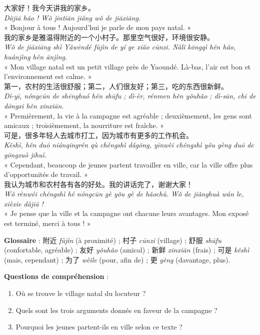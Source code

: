 \documentclass[11pt]{article}
\newcounter{popsec}
\newcounter{popsub}
\newcommand{\courssub}[1]{%
  \stepcounter{popsub}%
  \par\vspace{9pt}\noindent{\popxbold\fontsize{11.5}{13}\selectfont\color{popink}{\color{poporange}\thepopsec.\thepopsub}\hspace{6pt}#1}\par\nopagebreak\vspace{4pt}
}
\begin{document}
\courssub{Modèle complet d'exposé}

\begin{textebox}
大家好！我今天讲我的家乡。\\
\emph{Dàjiā hǎo ! Wǒ jīntiān jiǎng wǒ de jiāxiāng.}\\
« Bonjour à tous ! Aujourd'hui je parle de mon pays natal. »\\[4pt]
我的家乡是雅温得附近的一个小村子。那里空气很好，环境很安静。\\
\emph{Wǒ de jiāxiāng shì Yǎwēndé fùjìn de yí ge xiǎo cūnzi. Nàlǐ kōngqì hěn hǎo, huánjìng hěn ānjìng.}\\
« Mon village natal est un petit village près de Yaoundé. Là-bas, l'air est bon et l'environnement est calme. »\\[4pt]
第一，农村的生活很舒服；第二，人们很友好；第三，吃的东西很新鲜。\\
\emph{Dì-yī, nóngcūn de shēnghuó hěn shūfu ; dì-èr, rénmen hěn yǒuhǎo ; dì-sān, chī de dōngxi hěn xīnxiān.}\\
« Premièrement, la vie à la campagne est agréable ; deuxièmement, les gens sont amicaux ; troisièmement, la nourriture est fraîche. »\\[4pt]
可是，很多年轻人去城市打工，因为城市有更多的工作机会。\\
\emph{Kěshì, hěn duō niánqīngrén qù chéngshì dǎgōng, yīnwèi chéngshì yǒu gèng duō de gōngzuò jīhuì.}\\
« Cependant, beaucoup de jeunes partent travailler en ville, car la ville offre plus d'opportunités de travail. »\\[4pt]
我认为城市和农村各有各的好处。我的讲话完了，谢谢大家！\\
\emph{Wǒ rènwéi chéngshì hé nóngcūn gè yǒu gè de hǎochù. Wǒ de jiǎnghuà wán le, xièxie dàjiā !}\\
« Je pense que la ville et la campagne ont chacune leurs avantages. Mon exposé est terminé, merci à tous ! »
\end{textebox}

\textbf{Glossaire} : 附近 \emph{fùjìn} (à proximité) ; 村子 \emph{cūnzi} (village) ; 舒服 \emph{shūfu} (confortable, agréable) ; 友好 \emph{yǒuhǎo} (amical) ; 新鲜 \emph{xīnxiān} (frais) ; 可是 \emph{kěshì} (mais, cependant) ; 为了 \emph{wèile} (pour, afin de) ; 更 \emph{gèng} (davantage, plus).

\textbf{Questions de compréhension} :
\begin{enumerate}
\item Où se trouve le village natal du locuteur ?
\item Quels sont les trois arguments donnés en faveur de la campagne ?
\item Pourquoi les jeunes partent-ils en ville selon ce texte ?
\end{enumerate}
\end{document}

